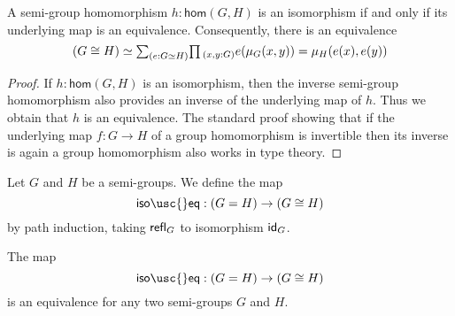 \begin{lem}\label{lem:grp_iso}
  A semi-group homomorphism $h:\mathsf{hom}(G,H)$ is an isomorphism if and only if its underlying map is an equivalence. Consequently, there is an equivalence
  \begin{equation*}
    (G\cong H)\simeq \sm{e:G\simeq H}\prd{x,y:G}e(\mu_G(x,y))=\mu_H(e(x),e(y))
  \end{equation*}
\end{lem}

\begin{proof}
  If $h:\mathsf{hom}(G,H)$ is an isomorphism, then the inverse semi-group homomorphism also provides an inverse of the underlying map of $h$. Thus we obtain that $h$ is an equivalence. The standard proof showing that if the underlying map $f:G\to H$ of a group homomorphism is invertible then its inverse is again a group homomorphism also works in type theory.
\end{proof}

\begin{defn}
Let $G$ and $H$ be a semi-groups. We define the map
\begin{equation*}
\mathsf{iso\usc{}eq} : (G=H)\to (G\cong H)
\end{equation*}
by path induction, taking $\refl{G}$ to isomorphism $\idfunc[G]$.
\end{defn}

\begin{thm}\label{thm:iso-eq-semi-group}
The map
\begin{equation*}
\mathsf{iso\usc{}eq} : (G=H)\to (G\cong H)
\end{equation*}
is an equivalence for any two semi-groups $G$ and $H$.
\end{thm}

